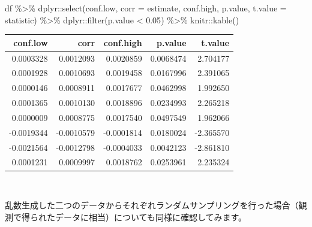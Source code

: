 \documentclass[]{tufte-handout}
\newenvironment{Shaded}{}{}
\newcommand{\AttributeTok}[1]{\textcolor[rgb]{0.49,0.56,0.16}{#1}}
\newcommand{\FloatTok}[1]{\textcolor[rgb]{0.25,0.63,0.44}{#1}}
\newcommand{\FunctionTok}[1]{\textcolor[rgb]{0.02,0.16,0.49}{#1}}
\newcommand{\NormalTok}[1]{#1}
\newcommand{\SpecialCharTok}[1]{\textcolor[rgb]{0.25,0.44,0.63}{#1}}
\begin{document}
\begin{Shaded}
\begin{Highlighting}[numbers=left,,]
\NormalTok{df }\SpecialCharTok{\%\textgreater{}\%} 
\NormalTok{  dplyr}\SpecialCharTok{::}\FunctionTok{select}\NormalTok{(conf.low, }\AttributeTok{corr =}\NormalTok{ estimate, conf.high,}
\NormalTok{                p.value, }\AttributeTok{t.value =}\NormalTok{ statistic) }\SpecialCharTok{\%\textgreater{}\%} 
\NormalTok{  dplyr}\SpecialCharTok{::}\FunctionTok{filter}\NormalTok{(p.value }\SpecialCharTok{\textless{}} \FloatTok{0.05}\NormalTok{) }\SpecialCharTok{\%\textgreater{}\%} 
\NormalTok{  knitr}\SpecialCharTok{::}\FunctionTok{kable}\NormalTok{()}
\end{Highlighting}
\end{Shaded}

\begin{longtable}[]{@{}rrrrr@{}}
\toprule
conf.low & corr & conf.high & p.value & t.value \\
\midrule
\endhead
0.0003328 & 0.0012093 & 0.0020859 & 0.0068474 & 2.704177 \\
0.0001928 & 0.0010693 & 0.0019458 & 0.0167996 & 2.391065 \\
0.0000146 & 0.0008911 & 0.0017677 & 0.0462998 & 1.992650 \\
0.0001365 & 0.0010130 & 0.0018896 & 0.0234993 & 2.265218 \\
0.0000009 & 0.0008775 & 0.0017540 & 0.0497549 & 1.962066 \\
-0.0019344 & -0.0010579 & -0.0001814 & 0.0180024 & -2.365570 \\
-0.0021564 & -0.0012798 & -0.0004033 & 0.0042123 & -2.861810 \\
0.0001231 & 0.0009997 & 0.0018762 & 0.0253961 & 2.235324 \\
\bottomrule
\end{longtable}

　

乱数生成した二つのデータからそれぞれランダムサンプリングを行った場合（観測で得られたデータに相当）についても同様に確認してみます。
\end{document}
